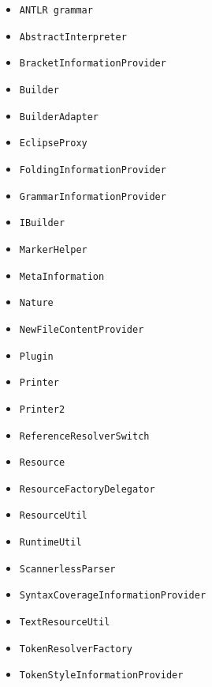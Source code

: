 \begin{itemize}
\item \texttt{ANTLR grammar}
\item \texttt{AbstractInterpreter}
\item \texttt{BracketInformationProvider}
\item \texttt{Builder}
\item \texttt{BuilderAdapter}
\item \texttt{EclipseProxy}
\item \texttt{FoldingInformationProvider}
\item \texttt{GrammarInformationProvider}
\item \texttt{IBuilder}
\item \texttt{MarkerHelper}
\item \texttt{MetaInformation}
\item \texttt{Nature}
\item \texttt{NewFileContentProvider}
\item \texttt{Plugin}
\item \texttt{Printer}
\item \texttt{Printer2}
\item \texttt{ReferenceResolverSwitch}
\item \texttt{Resource}
\item \texttt{ResourceFactoryDelegator}
\item \texttt{ResourceUtil}
\item \texttt{RuntimeUtil}
\item \texttt{ScannerlessParser}
\item \texttt{SyntaxCoverageInformationProvider}
\item \texttt{TextResourceUtil}
\item \texttt{TokenResolverFactory}
\item \texttt{TokenStyleInformationProvider}
\end{itemize}
